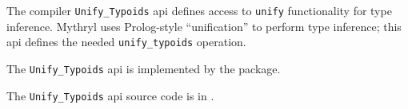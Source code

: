 
The compiler {\tt Unify\_Typoids} api defines access to {\tt unify} functionality 
for type inference.  Mythryl uses Prolog-style ``unification'' to perform type 
inference;  this api defines the needed {\tt unify\_typoids} operation. 

The {\tt Unify\_Typoids} api is implemented by the  package.

The {\tt Unify\_Typoids} api source code is in .

